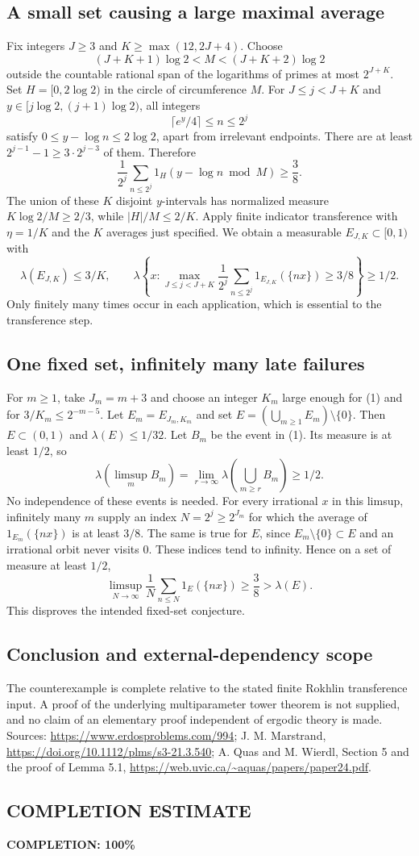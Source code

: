 \subsection*{A small set causing a large maximal average}
Fix integers $J\ge3$ and $K\ge\max(12,2J+4)$.
Choose
\[
 (J+K+1)\log2<M<(J+K+2)\log2
\]
outside the countable rational span of the logarithms of primes at most $2^{J+K}$.
Set $H=[0,2\log2)$ in the circle of circumference $M$.
For $J\le j<J+K$ and $y\in[j\log2,(j+1)\log2)$, all integers
\[
 \lceil e^y/4\rceil\le n\le2^j
\]
satisfy $0\le y-\log n\le2\log2$, apart from irrelevant endpoints.
There are at least $2^{j-1}-1\ge3\cdot2^{j-3}$ of them. Therefore
\[
 \frac1{2^j}\sum_{n\le2^j}1_H(y-\log n\bmod M)\ge\frac38.
\]
The union of these $K$ disjoint $y$-intervals has normalized measure
$K\log2/M\ge2/3$, while $|H|/M\le2/K$.
Apply finite indicator transference with $\eta=1/K$ and the $K$ averages just specified. We obtain a measurable $E_{J,K}\subset[0,1)$ with
\[
 \lambda(E_{J,K})\le3/K,\qquad
 \lambda\left\{x:\max_{J\le j<J+K}
 \frac1{2^j}\sum_{n\le2^j}1_{E_{J,K}}(\{nx\})\ge3/8\right\}\ge1/2.
 \tag{1}
\]
Only finitely many times occur in each application, which is essential to the transference step.

\subsection*{One fixed set, infinitely many late failures}
For $m\ge1$, take $J_m=m+3$ and choose an integer $K_m$ large enough for (1) and for
$3/K_m\le2^{-m-5}$.
Let $E_m=E_{J_m,K_m}$ and set
$E=(\bigcup_{m\ge1}E_m)\setminus\{0\}$.
Then $E\subset(0,1)$ and $\lambda(E)\le1/32$.
Let $B_m$ be the event in (1). Its measure is at least $1/2$, so
\[
 \lambda(\limsup_mB_m)
 =\lim_{r\to\infty}\lambda\left(\bigcup_{m\ge r}B_m\right)\ge1/2.
\]
No independence of these events is needed.
For every irrational $x$ in this limsup, infinitely many $m$ supply an index
$N=2^j\ge2^{J_m}$ for which the average of $1_{E_m}(\{nx\})$ is at least $3/8$.
The same is true for $E$, since $E_m\setminus\{0\}\subset E$ and an irrational orbit never visits $0$.
These indices tend to infinity. Hence on a set of measure at least $1/2$,
\[
 \limsup_{N\to\infty}\frac1N\sum_{n\le N}1_E(\{nx\})\ge\frac38>\lambda(E).
\]
This disproves the intended fixed-set conjecture.

\subsection*{Conclusion and external-dependency scope}
The counterexample is complete relative to the stated finite Rokhlin transference input. A proof of the underlying multiparameter tower theorem is not supplied, and no claim of an elementary proof independent of ergodic theory is made. Sources: \url{https://www.erdosproblems.com/994}; J. M. Marstrand, \url{https://doi.org/10.1112/plms/s3-21.3.540}; A. Quas and M. Wierdl, Section 5 and the proof of Lemma 5.1, \url{https://web.uvic.ca/~aquas/papers/paper24.pdf}.
\subsection*{COMPLETION ESTIMATE}
\textbf{COMPLETION: 100\%}
